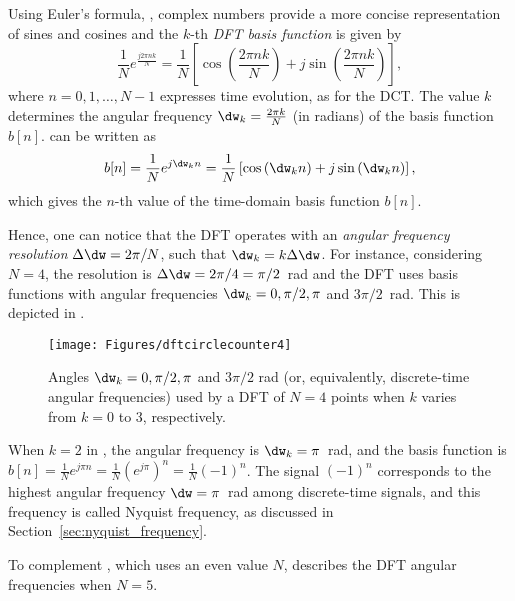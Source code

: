 Using Euler's formula, , complex numbers provide a more concise representation of sines and cosines and
the $k$-th \emph{DFT basis function} is given by
\begin{equation}
\frac{1}{N} e^{\frac {j2\pi n k} N} = \frac{1}{N} \left[ \cos \left(\frac {2\pi nk} N \right) + j \sin \left(\frac {2\pi nk} N \right) \right],
\label{eq:dft_basis_function}
\end{equation}
where $n=0,1,\ldots,N-1$ expresses time evolution, as for the DCT. The value $k$ determines the angular frequency $\dw_k = \frac {2\pi k} N$ (in radians) of the basis function $b[n]$.  can be written as
\begin{equation}
b[n] = \frac{1}{N} e^{j \dw_k n} = \frac{1}{N} \left[ \cos \left(\dw_k n \right) + j \sin \left(\dw_k n \right) \right],
\label{eq:dft_basis_rewritten}
\end{equation}
which gives the $n$-th value of the time-domain basis function $b[n]$.

Hence, one can notice that the DFT operates with an \emph{angular frequency resolution} $\Delta \dw = 2 \pi / N$,
such that $\dw_k = k \Delta \dw$.
For instance, considering $N=4$, the resolution is $\Delta \dw = 2 \pi / 4 = \pi /2$~rad and the DFT uses basis functions with angular
frequencies $\dw_k =0, \pi/2, \pi$ and $3\pi/2$~rad. 
This is depicted in .

\begin{figure}[!htb]
        \centering
                \texttt{[image: Figures/dftcirclecounter4]}
        \caption{Angles $\dw_k=0, \pi/2, \pi$ and $3\pi/2$ rad (or, equivalently, discrete-time angular frequencies) used by a DFT of $N=4$ points when $k$ varies from $k=0$ to 3, respectively.\label{fig:dftcirclecounter4}}				
\end{figure}

When $k=2$ in , the angular frequency is $\dw_k=\pi$~rad, and the basis function
is $b[n]=\frac{1}{N} e^{j \pi n} = \frac{1}{N} \left(e^{j \pi} \right)^n = \frac{1}{N} (-1)^n$. The signal $(-1)^n$ corresponds to the
highest angular frequency $\dw=\pi$~rad among discrete-time signals, and this frequency is
called Nyquist frequency, as discussed in Section~\ref{sec:nyquist_frequency}.

To complement , which uses an even value $N$,  describes the DFT angular frequencies
when $N=5$.

